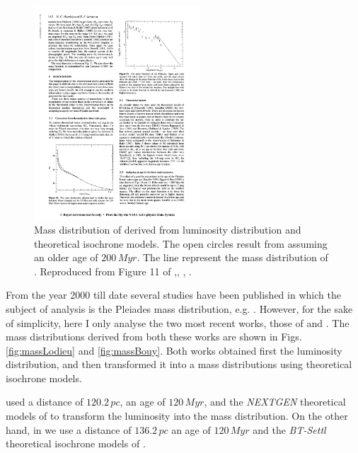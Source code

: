 \begin{figure}[ht!]
\begin{center}
\includegraphics[height=8cm]{background/Figures/F11_Hambly1991.pdf}
\caption{Mass distribution of \citet{Hambly1991} derived from luminosity distribution and theoretical isochrone models. The open circles result from assuming an older age of $200\,Myr$. The line represent the mass distribution of \citet{1980IAUS...85..157V}. Reproduced from Figure 11 of \citet{Hambly1991},\textit{}, , .}
\label{fig:massHambly}
\end{center}
\end{figure}

From the year 2000 till date several studies have been published in which the subject of analysis is the Pleiades mass distribution, e.g. \citet{2000ASPC..198...59H, 2002MNRAS.335..853J, 2003A&A...400..891M, 2004A&A...426...75M, 2007MNRAS.380..712L}. However, for the sake of simplicity, here I only analyse the two most recent works, those of \citet{Lodieu2012} and \citet{Bouy2015}. The mass distributions derived from both these works are shown in Figs. \ref{fig:massLodieu} and \ref{fig:massBouy}. Both works obtained first the luminosity distribution, and then transformed it into a mass distributions using theoretical isochrone models. 

\citet{Lodieu2012} used a distance of $120.2\,pc$, an age of $120\, Myr$, and the \emph{NEXTGEN} theoretical models of \citet{1998A&A...337..403B} to transform the luminosity into the mass distribution. On the other hand, in \citet{Bouy2015} we use a distance of $136.2\,pc$ an age of $120\,Myr$ and the \emph{BT-Settl} theoretical isochrone models of \citet{2014IAUS..299..271A}. 



